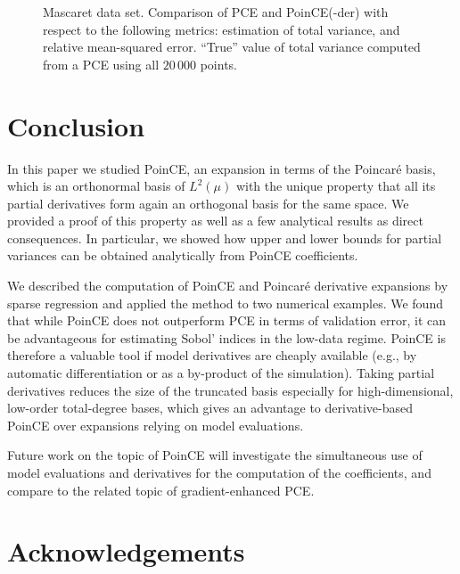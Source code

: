 \documentclass[a4paper,11pt]{article}
\theoremstyle{definition}
\theoremstyle{remark}
\theoremstyle{theorem}
\begin{document}
\begin{figure}[htbp]
	\centering
	\hspace{1cm}
	\caption{Mascaret data set. Comparison of PCE and PoinCE(-der) with respect to the following metrics: estimation of total variance, and relative mean-squared error. ``True'' value of total variance computed from a PCE using all $20\,000$ points.}
	\label{fig:mascaret_extra}
\end{figure}


\FloatBarrier %


\section{Conclusion}
\label{sec:conclusion}

In this paper we studied PoinCE, an expansion in terms of the Poincar\'e basis, which is an orthonormal basis of $L^2(\mu)$ with the unique property that all its partial derivatives form again an orthogonal basis for the same space.
We provided a proof of this property as well as a few analytical results as direct consequences.
In particular, we showed how upper and lower bounds for partial variances can be obtained analytically from PoinCE coefficients.

We described the computation of PoinCE and Poincar\'e derivative expansions by sparse regression and applied the method to two numerical examples. We found that while PoinCE does not outperform PCE in terms of validation error, it can be advantageous for estimating Sobol' indices in the low-data regime. 
PoinCE is therefore a valuable tool if model derivatives are cheaply available (e.g., by automatic differentiation or as a by-product of the simulation).
Taking partial derivatives reduces the size of the truncated basis especially for high-dimensional, low-order total-degree bases, which gives an advantage to derivative-based PoinCE over expansions relying on model evaluations.

Future work on the topic of PoinCE will investigate the simultaneous use of  model evaluations and derivatives for the computation of the coefficients, and compare to the related topic of gradient-enhanced PCE.

\section*{Acknowledgements}
\end{document}
